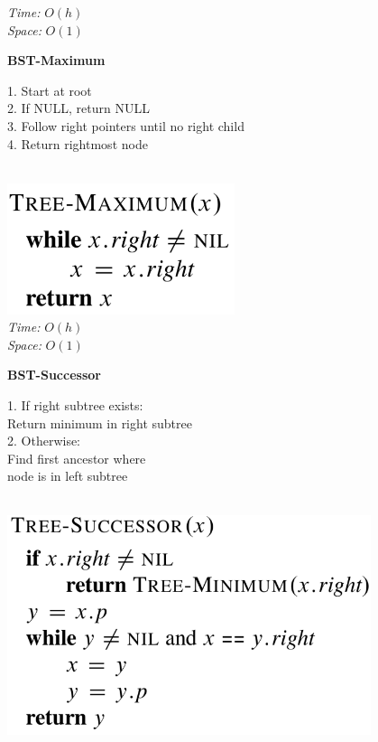{\begin{minipage}[t]{1\textwidth}
\begin{minipage}[t]{0.19\textwidth}
        \textit{Time:} \(O(h)\)\\
        \textit{Space:} \(O(1)\)
    \end{minipage}
    \hfill
    \begin{minipage}[t]{0.19\textwidth}
        \centering
        \textbf{\scriptsize BST-Maximum}\\[2pt]
        \scriptsize
        \begin{minipage}[t]{\textwidth}
            \scriptsize
            1. Start at root\\
            2. If NULL, return NULL\\
            3. Follow right pointers until no right child\\
            4. Return rightmost node
        \end{minipage}\\[8pt]
        \includegraphics[width=0.5\textwidth]{images/bst-maximum.png}\\[2pt]
        \textit{Time:} \(O(h)\)\\
        \textit{Space:} \(O(1)\)
    \end{minipage}
    \hfill
    \begin{minipage}[t]{0.19\textwidth}
        \centering
        \textbf{\scriptsize BST-Successor}\\[2pt]
        \scriptsize
        \begin{minipage}[t]{\textwidth}
            \scriptsize
            1. If right subtree exists:\\
            \quad Return minimum in right subtree\\
            2. Otherwise:\\
            \quad Find first ancestor where\\
            \quad node is in left subtree
        \end{minipage}\\[4pt]
        \includegraphics[width=0.8\textwidth]{images/bst-successor.png}\\[2pt]

\end{minipage}
\end{minipage}}
